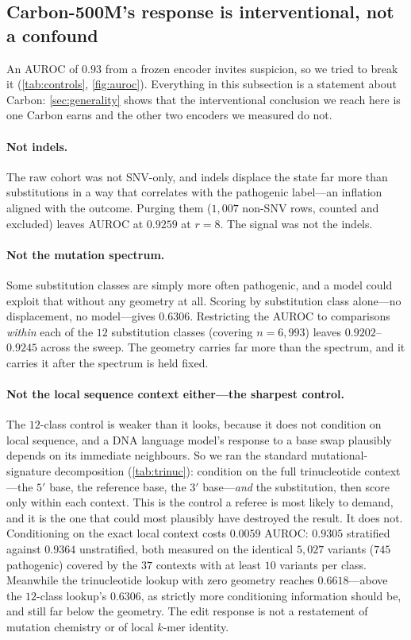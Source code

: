 \documentclass{article}
\newcommand{\carbon}{Carbon-500M\xspace}
\begin{document}
\figSensitivity

\subsection{\carbon's response is interventional, not a confound}
\label{sec:controls}

An AUROC of $0.93$ from a frozen encoder invites suspicion, so we tried to break it
(\cref{tab:controls}, \cref{fig:auroc}). Everything in this subsection is a statement about Carbon:
\cref{sec:generality} shows that the interventional conclusion we reach here is one Carbon earns and
the other two encoders we measured do not.

\paragraph{Not indels.} The raw cohort was not SNV-only, and indels displace the state far more than
substitutions in a way that correlates with the pathogenic label---an inflation aligned with the
outcome. Purging them ($1{,}007$ non-SNV rows, counted and excluded) leaves AUROC at $0.9259$ at
$r{=}8$. The signal was not the indels.

\paragraph{Not the mutation spectrum.} Some substitution classes are simply more often pathogenic,
and a model could exploit that without any geometry at all. Scoring by substitution class
alone---no displacement, no model---gives $0.6306$. Restricting the AUROC to comparisons
\emph{within} each of the $12$ substitution classes (covering $n{=}6{,}993$) leaves
$0.9202$--$0.9245$ across the sweep. The geometry carries far more than the spectrum, and it carries
it after the spectrum is held fixed.

\paragraph{Not the local sequence context either---the sharpest control.} The $12$-class control is
weaker than it looks, because it does not condition on local sequence, and a DNA language model's
response to a base swap plausibly depends on its immediate neighbours. So we ran the standard
mutational-signature decomposition (\cref{tab:trinuc}): condition on the full trinucleotide
context---the $5'$ base, the reference base, the $3'$ base---\emph{and} the substitution, then score
only within each context. This is the control a referee is most likely to demand, and it is the one
that could most plausibly have destroyed the result. It does not. Conditioning on the exact local
context costs $0.0059$ AUROC: $0.9305$ stratified against $0.9364$ unstratified, both measured on
the identical $5{,}027$ variants ($745$ pathogenic) covered by the $37$ contexts with at least $10$
variants per class. Meanwhile the trinucleotide lookup with zero geometry reaches
$0.6618$---above the $12$-class lookup's $0.6306$, as strictly more conditioning information should
be, and still far below the geometry. The edit response is not a restatement of mutation chemistry
or of local $k$-mer identity.
\end{document}
